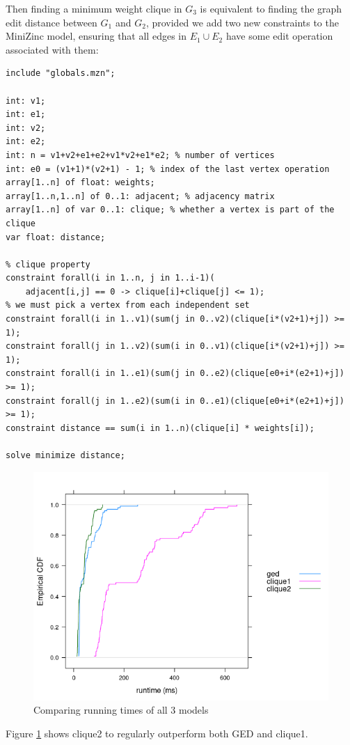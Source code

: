 \documentclass{article}
\theoremstyle{definition}
\begin{document}
Then finding a minimum weight clique in $G_3$ is equivalent to finding the graph edit distance between $G_1$ and $G_2$, provided we add two new constraints to the MiniZinc model, ensuring that all edges in $E_1 \cup E_2$ have some edit operation associated with them:
\begin{lstlisting}
include "globals.mzn";

int: v1;
int: e1;
int: v2;
int: e2;
int: n = v1+v2+e1+e2+v1*v2+e1*e2; % number of vertices
int: e0 = (v1+1)*(v2+1) - 1; % index of the last vertex operation
array[1..n] of float: weights;
array[1..n,1..n] of 0..1: adjacent; % adjacency matrix
array[1..n] of var 0..1: clique; % whether a vertex is part of the clique
var float: distance;

% clique property
constraint forall(i in 1..n, j in 1..i-1)(
    adjacent[i,j] == 0 -> clique[i]+clique[j] <= 1);
% we must pick a vertex from each independent set
constraint forall(i in 1..v1)(sum(j in 0..v2)(clique[i*(v2+1)+j]) >= 1);
constraint forall(j in 1..v2)(sum(i in 0..v1)(clique[i*(v2+1)+j]) >= 1);
constraint forall(i in 1..e1)(sum(j in 0..e2)(clique[e0+i*(e2+1)+j]) >= 1);
constraint forall(j in 1..e2)(sum(i in 0..e1)(clique[e0+i*(e2+1)+j]) >= 1);
constraint distance == sum(i in 1..n)(clique[i] * weights[i]);

solve minimize distance;
\end{lstlisting}
\begin{figure}
  \includegraphics{comparison.png}
  \caption{Comparing running times of all 3 models}
  \label{fig:comparison}
\end{figure}
Figure \ref{fig:comparison} shows clique2 to regularly outperform both GED and clique1.
\end{document}
